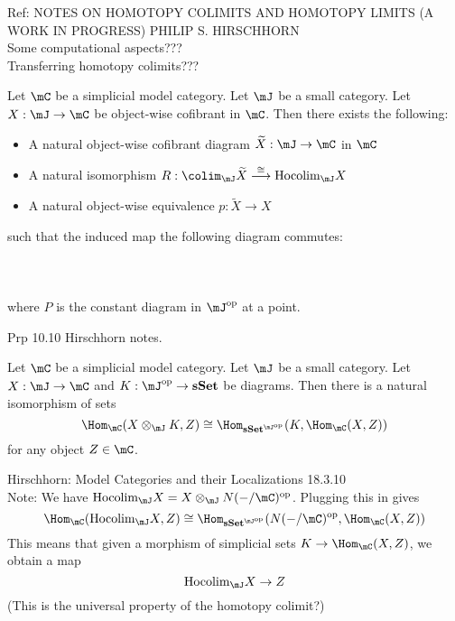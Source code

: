 \documentclass[a4paper]{article}
\begin{document}
Ref: NOTES ON HOMOTOPY COLIMITS AND HOMOTOPY LIMITS (A WORK IN PROGRESS) PHILIP S. HIRSCHHORN\\

Some computational aspects???\\

Transferring homotopy colimits???

\begin{prp}{}{} Let $\mC$ be a simplicial model category. Let $\mJ$ be a small category. Let $X:\mJ\to\mC$ be object-wise cofibrant in $\mC$. Then there exists the following: 
\begin{itemize}
\item A natural object-wise cofibrant diagram $\widetilde{X}:\mJ\to\mC$ in $\mC$
\item A natural isomorphism $R:\colim_\mJ\widetilde{X}\overset{\cong}{\longrightarrow}\text{Hocolim}_\mJ X$
\item A natural object-wise equivalence $p:\widetilde{X}\to X$
\end{itemize}
such that the induced map the following diagram commutes: \\~\\
\\~\\
where $P$ is the constant diagram in $\mJ^\text{op}$ at a point. 
\end{prp}

Prp 10.10 Hirschhorn notes. 

\begin{prp}{}{} Let $\mC$ be a simplicial model category. Let $\mJ$ be a small category. Let $X:\mJ\to\mC$ and $K:\mJ^\text{op}\to\bold{sSet}$ be diagrams. Then there is a natural isomorphism of sets $$\Hom_\mC(X\otimes_\mJ K,Z)\cong\Hom_{\bold{sSet}^{\mJ^\text{op}}}(K,\Hom_\mC(X,Z))$$ for any object $Z\in\mC$. 
\end{prp}

Hirschhorn: Model Categories and their Localizations 18.3.10\\

Note: We have $\text{Hocolim}_\mJ X=X\otimes_\mJ N(-/\mC)^\text{op}$. Plugging this in gives $$\Hom_\mC(\text{Hocolim}_\mJ X,Z)\cong\Hom_{\bold{sSet}^{\mJ^\text{op}}}(N(-/\mC)^\text{op},\Hom_\mC(X,Z))$$ This means that given a morphism of simplicial sets $K\to\Hom_\mC(X,Z)$, we obtain a map $$\text{Hocolim}_\mJ X\to Z$$ (This is the universal property of the homotopy colimit?)
\end{document}
